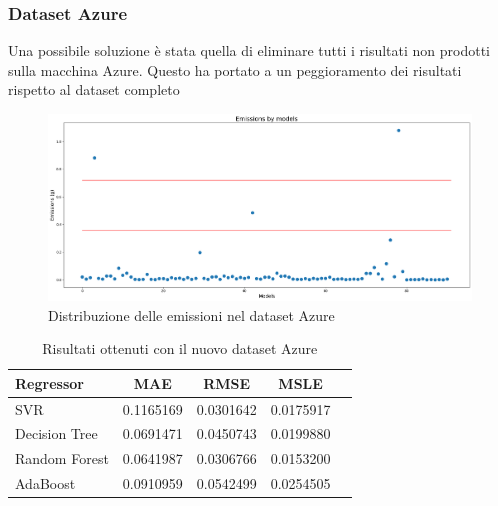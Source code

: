 \newpage

\subsubsection{Dataset Azure}

\noindent Una possibile soluzione è stata quella di eliminare tutti i risultati non prodotti sulla macchina Azure. Questo ha portato a un peggioramento dei risultati rispetto al dataset completo

\begin{figure}[H]
    \centering
    \includegraphics[scale=0.25]{images/nuova-situazione2.png}
    \caption{Distribuzione delle emissioni nel dataset Azure}
\end{figure}


\begin{table}[H]
    \centering
    \begin{tabular}{|>{\centering\arraybackslash}m{5cm}|c|c|c|c|}
        \hline
        \textbf{Regressor} & \textbf{MAE} & \textbf{RMSE} & \textbf{MSLE} \\ [10pt]
        \hline
        SVR & 0.1165169 & 0.0301642 & 0.0175917 \\ [10pt]
        \hline
        Decision Tree & 0.0691471 & 0.0450743 & 0.0199880 \\ [10pt]
        \hline
        Random Forest & 0.0641987 & 0.0306766 & 0.0153200 \\ [10pt]
        \hline
        AdaBoost & 0.0910959 & 0.0542499 & 0.0254505 \\ [10pt]
        \hline
    \end{tabular}
    \caption{Risultati ottenuti con il nuovo dataset Azure}
    \label{tab:results}
\end{table}

